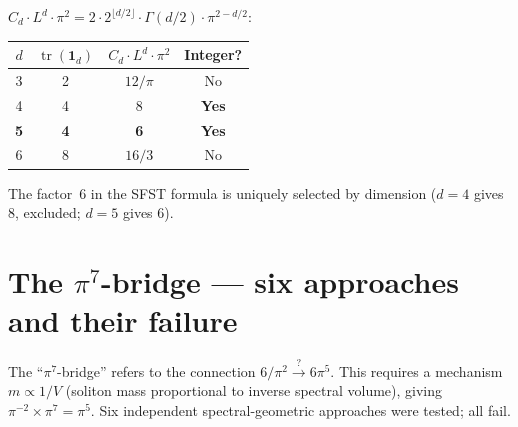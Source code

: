 \documentclass[11pt,a4paper]{article}
\begin{document}
$C_d\cdot L^d\cdot\pi^2 = 2\cdot 2^{\lfloor d/2\rfloor}\cdot\Gamma(d/2)\cdot\pi^{2-d/2}$:
\begin{center}
\renewcommand{\arraystretch}{1.15}
\begin{tabular}{cccc}
\toprule
$d$ & $\operatorname{tr}(\mathbf{1}_d)$ & $C_d\cdot L^d\cdot\pi^2$ & Integer?\\
\midrule
3 & 2 & $12/\pi$ & No\\
4 & 4 & 8 & \textbf{Yes}\\
\textbf{5} & \textbf{4} & \textbf{6} & \textbf{Yes}\\
6 & 8 & $16/3$ & No\\
\bottomrule
\end{tabular}
\end{center}
The factor~6 in the SFST formula is uniquely selected by dimension ($d=4$ gives 8, excluded;
$d=5$ gives 6).

\section{The $\pi^7$-bridge --- six approaches and their failure}
\label{sec:pi7bridge}

The ``$\pi^7$-bridge'' refers to the connection
$6/\pi^2 \xrightarrow{\;?\;} 6\pi^5$.
This requires a mechanism $m\propto 1/V$ (soliton mass proportional to
inverse spectral volume), giving $\pi^{-2}\times\pi^7=\pi^5$.
Six independent spectral-geometric approaches were tested; all fail.
\end{document}
